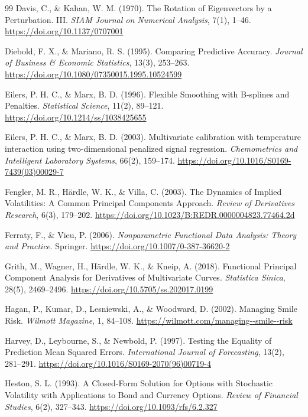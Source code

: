 \documentclass[a4paper,11pt]{article}
\begin{document}
\begin{thebibliography}{99}
Davis, C., \& Kahan, W. M. (1970). The Rotation of Eigenvectors by a Perturbation. III. \emph{SIAM Journal on Numerical Analysis}, 7(1), 1--46. \url{https://doi.org/10.1137/0707001}

Diebold, F. X., \& Mariano, R. S. (1995). Comparing Predictive Accuracy. \emph{Journal of Business \& Economic Statistics}, 13(3), 253--263. \url{https://doi.org/10.1080/07350015.1995.10524599}

Eilers, P. H. C., \& Marx, B. D. (1996). Flexible Smoothing with B-splines and Penalties. \emph{Statistical Science}, 11(2), 89--121. \url{https://doi.org/10.1214/ss/1038425655}

Eilers, P. H. C., \& Marx, B. D. (2003). Multivariate calibration with temperature interaction using two-dimensional penalized signal regression. \emph{Chemometrics and Intelligent Laboratory Systems}, 66(2), 159--174. \url{https://doi.org/10.1016/S0169-7439(03)00029-7}

Fengler, M. R., Härdle, W. K., \& Villa, C. (2003). The Dynamics of Implied Volatilities: A Common Principal Components Approach. \emph{Review of Derivatives Research}, 6(3), 179--202. \url{https://doi.org/10.1023/B:REDR.0000004823.77464.2d}

Ferraty, F., \& Vieu, P. (2006). \emph{Nonparametric Functional Data Analysis: Theory and Practice}. Springer. \url{https://doi.org/10.1007/0-387-36620-2}

Grith, M., Wagner, H., Härdle, W. K., \& Kneip, A. (2018). Functional Principal Component Analysis for Derivatives of Multivariate Curves. \emph{Statistica Sinica}, 28(5), 2469--2496. \url{https://doi.org/10.5705/ss.202017.0199}

Hagan, P., Kumar, D., Lesniewski, A., \& Woodward, D. (2002). Managing Smile Risk. \emph{Wilmott Magazine}, 1, 84--108. \url{https://wilmott.com/managing--smile--risk}

Harvey, D., Leybourne, S., \& Newbold, P. (1997). Testing the Equality of Prediction Mean Squared Errors. \emph{International Journal of Forecasting}, 13(2), 281--291. \url{https://doi.org/10.1016/S0169-2070(96)00719-4}

Heston, S. L. (1993). A Closed-Form Solution for Options with Stochastic Volatility with Applications to Bond and Currency Options. \emph{Review of Financial Studies}, 6(2), 327--343. \url{https://doi.org/10.1093/rfs/6.2.327}


\end{thebibliography}
\end{document}
